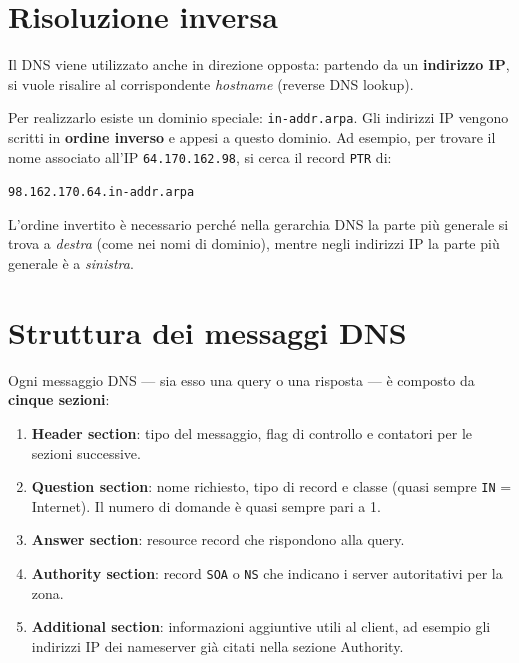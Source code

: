 \documentclass{article}
\begin{document}
\section*{Risoluzione inversa}

Il DNS viene utilizzato anche in direzione opposta: partendo da un
\textbf{indirizzo IP}, si vuole risalire al corrispondente \emph{hostname}
(reverse DNS lookup).

Per realizzarlo esiste un dominio speciale: \texttt{in-addr.arpa}. Gli
indirizzi IP vengono scritti in \textbf{ordine inverso} e appesi a questo
dominio. Ad esempio, per trovare il nome associato all'IP
\texttt{64.170.162.98}, si cerca il record \texttt{PTR} di:

\begin{center}
    \texttt{98.162.170.64.in-addr.arpa}
\end{center}

L'ordine invertito è necessario perché nella gerarchia DNS la parte più
generale si trova a \emph{destra} (come nei nomi di dominio), mentre negli
indirizzi IP la parte più generale è a \emph{sinistra}.


\section*{Struttura dei messaggi DNS}

Ogni messaggio DNS --- sia esso una query o una risposta --- è composto da
\textbf{cinque sezioni}:

\begin{enumerate}[label=\textbf{\arabic*.}]
    \item \textbf{Header section}: tipo del messaggio, flag di controllo e
        contatori per le sezioni successive.
    \item \textbf{Question section}: nome richiesto, tipo di record e classe
        (quasi sempre \texttt{IN} = Internet). Il numero di domande è quasi
        sempre pari a 1.
    \item \textbf{Answer section}: resource record che rispondono alla query.
    \item \textbf{Authority section}: record \texttt{SOA} o \texttt{NS} che
        indicano i server autoritativi per la zona.
    \item \textbf{Additional section}: informazioni aggiuntive utili al client,
        ad esempio gli indirizzi IP dei nameserver già citati nella sezione
        Authority.
\end{enumerate}
\end{document}
